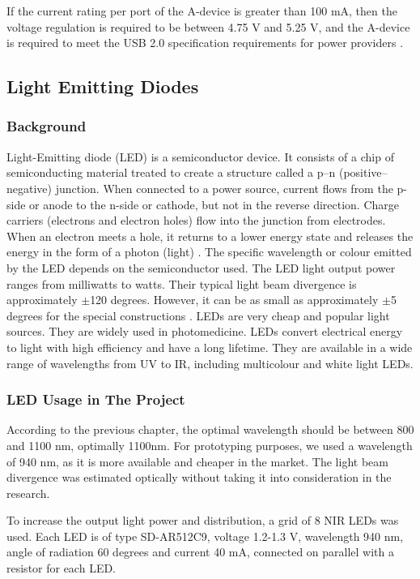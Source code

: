 If the current rating per port of the A-device is greater than 100 mA, then the voltage regulation is required to be between 4.75 V and 5.25 V, and the A-device is required to meet the USB 2.0 specification requirements for power providers \parencite{otg}.


\subsection{Light Emitting Diodes}
\subsubsection{Background}
Light-Emitting diode (LED) is a semiconductor device. It consists of a chip of semiconducting material treated to create a structure called a p–n (positive–negative) junction. When connected to a power source, current flows from the p-side or anode to the n-side or cathode, but not in the reverse direction. Charge carriers (electrons and electron holes) flow into the junction from electrodes. When an electron meets a hole, it returns to a lower energy state and releases the energy in the form of a photon (light) \parencite{led}. The specific wavelength or colour emitted by the LED depends on the semiconductor used. The LED light output power ranges from milliwatts to watts. Their typical light beam divergence is approximately $\pm$120 degrees. However, it can be as small as approximately $\pm$5 degrees for the special constructions \parencite{led}. LEDs are very cheap and popular light sources. They are widely used in photomedicine. LEDs convert electrical energy to light with high efficiency and have a long lifetime. They are available in a wide range of wavelengths from UV to IR, including multicolour and white light LEDs. 

\subsubsection{LED Usage in The Project}

According to the previous chapter, the optimal wavelength should be between 800 and 1100 nm, optimally 1100nm. For prototyping purposes, we used a wavelength of 940 nm, as it is more available and cheaper in the market. The light beam divergence was estimated optically without taking it into consideration in the research.

To increase the output light power and distribution, a grid of 8 NIR LEDs was used. Each LED is of type SD-AR512C9, voltage 1.2-1.3 V, wavelength 940 nm, angle of radiation 60 degrees and current 40 mA, connected on parallel with a resistor for each LED. 

